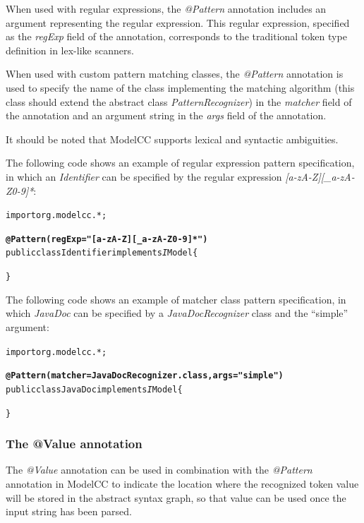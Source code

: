 \documentclass[a4paper,twoside,onecolumn]{article}
\newenvironment{colframe}{%
  \begin{Sbox} 
    \begin{minipage}{.8\columnwidth} 
}{%

  \end{minipage} 
  \end{Sbox} 
  \begin{center} 
    \fcolorbox{black}{MyGray}{\TheSbox} 
  \end{center} 
}
\newcommand{\an}[1]{\emph{#1}} %
\begin{document}
When used with regular expressions, the \an{@Pattern} annotation includes an argument representing the regular expression. This regular
expression, specified as the \emph{regExp} field of the annotation, corresponds to the traditional token type definition in lex-like scanners.

When used with custom pattern matching classes, the \an{@Pattern} annotation is used to specify the name of the class implementing the matching
algorithm (this class should extend the abstract class \emph{PatternRecognizer}) in the \emph{matcher} field of the annotation and an argument string in the \emph{args} field of the annotation.

It should be noted that ModelCC supports lexical and syntactic ambiguities.

The following code shows an example of regular expression pattern specification, in which an \emph{Identifier} can be specified by the regular expression \emph{[a-zA-Z][\_a-zA-Z0-9]*}:

\begin{colframe}
\begin{alltt}
import org.modelcc.*;

{\bf\unskip @Pattern(regExp="[a-zA-Z][_a-zA-Z0-9]*")}
public class Identifier implements{\emph IModel} \{

\}
\end{alltt}
\end{colframe}

The following code shows an example of matcher class pattern specification, in which \emph{JavaDoc} can be specified by a \emph{JavaDocRecognizer} class and the ``simple'' argument:

\begin{colframe}
\begin{alltt}
import org.modelcc.*;

{\bf\unskip @Pattern(matcher=JavaDocRecognizer.class,args="simple")}
public class JavaDoc implements{\emph IModel} \{

\}
\end{alltt}
\end{colframe}

\subsubsection{The @Value annotation}

The \an{@Value} annotation can be used in combination with the \an{@Pattern} annotation in ModelCC to indicate the location where the recognized
token value will be stored in the abstract syntax graph, so that value can be used once the input string has been parsed.
\end{document}
